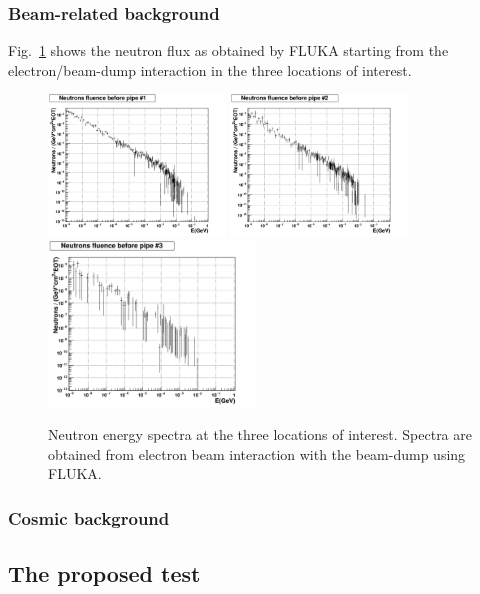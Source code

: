 \subsubsection{Beam-related background}



Fig.~\ref{fig:nu-comp} shows the neutron flux  as obtained by  FLUKA starting from the electron/beam-dump interaction  in the  three locations of interest. 
\begin{figure}[h!] 
\center
\includegraphics[width=4.7cm]{figs/NeutronsPipe1_1D.pdf}
\includegraphics[width=4.7cm]{figs/NeutronsPipe2_1D.pdf}
\includegraphics[width=5.5cm]{figs/NeutronsPipe3_1D.pdf}
\caption {Neutron energy spectra at the three locations of interest. Spectra are obtained from electron beam interaction with the beam-dump using FLUKA.}
\label{fig:nu-comp}
\end{figure}


\subsubsection{Cosmic background}

\subsection{The proposed test}

